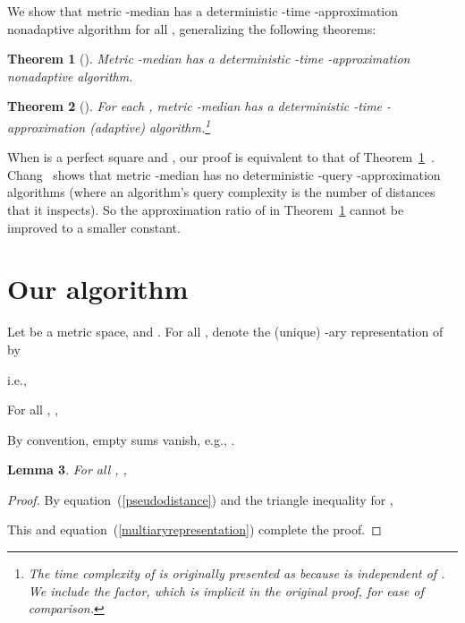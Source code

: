 \documentclass[letterpaper,12pt]{article}
\newtheorem{theorem}{Theorem}
\newtheorem{lemma}[theorem]{Lemma}
\begin{document}
We show
that {\sc metric -median} has a deterministic
-time -approximation nonadaptive algorithm for all
, generalizing the following theorems:

\begin{theorem}[\cite{Cha13}]\label{mypreviousupperboundresult}
{\sc Metric -median} has a deterministic -time
-approximation nonadaptive algorithm.
\end{theorem}

\begin{theorem}[\cite{Wu14}]
For each
,
{\sc metric -median} has a deterministic -time
-approximation (adaptive) algorithm.\footnote{The time complexity of
 is originally presented as  because  is
independent of .
We include the  factor, which is implicit in the original proof,
for ease of comparison.}
\end{theorem}

When  is a perfect square and , our proof is equivalent to that of
Theorem~\ref{mypreviousupperboundresult}~\cite{Cha13}.
Chang~\cite{Cha14arXiv} shows that {\sc metric -median} has no
deterministic -query -approximation algorithms
(where
an algorithm's
query complexity
is the number of distances that it inspects).
So the approximation ratio of  in Theorem~\ref{mypreviousupperboundresult}
cannot be
improved
to
a
smaller
constant.


\section{Our algorithm}

Let  be a metric space,
 and .
For all ,
denote
the
(unique)
-ary representation of 
by

i.e.,


For all , ,

By convention,
empty sums vanish, e.g.,
.

\begin{lemma}\label{pseudodistanceislarger}
For all , ,

\end{lemma}
\begin{proof}
By equation~(\ref{pseudodistance}) and the triangle inequality for ,

This and
equation~(\ref{multiaryrepresentation})
complete the proof.
\end{proof}
\end{document}
